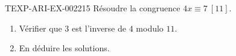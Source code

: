 \begin{exercice}{TEXP-ARI-EX-002}{2}{15}
Résoudre la congruence $4x\equiv7\ [11]$.
\begin{enumerate}
  \item Vérifier que $3$ est l'inverse de $4$ modulo $11$.
  \item En déduire les solutions.
\end{enumerate}
\end{exercice}
